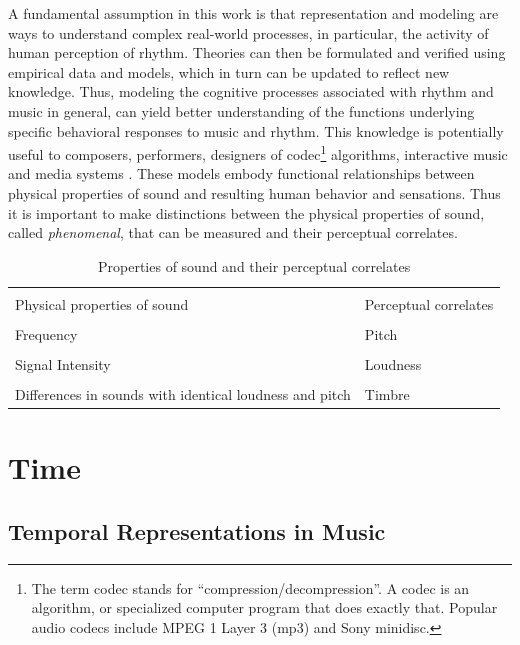 A fundamental assumption in this work is that representation and modeling
are ways to understand complex real-world processes, in particular, 
the activity of human perception of rhythm. Theories can then be
formulated and verified using empirical data and models, which in 
turn can be updated to reflect new knowledge.  Thus, modeling the cognitive 
processes associated with rhythm and music in general, can yield better
understanding of the functions underlying specific behavioral
responses to music and rhythm.  This knowledge is potentially useful 
to composers, performers, designers of codec\footnote{The term codec 
stands for ``compression/decompression''. A codec is an algorithm, or
specialized computer program that does exactly that. Popular audio
codecs include MPEG 1 Layer 3 (mp3) and Sony minidisc.} 
algorithms, interactive music and media systems \cite{Desain:92}.
These models embody functional relationships between physical
properties of sound and resulting human behavior and sensations.
Thus it is important to make distinctions between the physical
properties of sound, called {\it phenomenal}, that can be measured and their
perceptual correlates.  
%
%
\begin{table}
\begin{tabular}{|l|l|} %
 \hline 
 & \\
 Physical properties of sound  & Perceptual correlates \\ \hline \hline
 & \\
 Frequency & Pitch   \\ \hline
 & \\
 Signal Intensity & Loudness   \\ \hline
 & \\
 Differences in sounds with identical loudness and pitch & Timbre \\ \hline
\end{tabular}
\caption {Properties of sound and their perceptual correlates}
\end{table}

\vspace{7mm}
\section{Time}
\vspace{3mm}

\subsection{Temporal Representations in Music}

